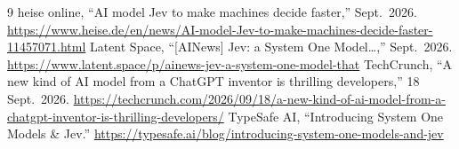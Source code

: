 \documentclass[11pt]{article}
\begin{document}
\begin{thebibliography}{9}
 heise online, ``AI model Jev to make machines decide faster,'' Sept.\ 2026.
  \url{https://www.heise.de/en/news/AI-model-Jev-to-make-machines-decide-faster-11457071.html}
 Latent Space, ``[AINews] Jev: a System One Model\dots,'' Sept.\ 2026.
  \url{https://www.latent.space/p/ainews-jev-a-system-one-model-that}
 TechCrunch, ``A new kind of AI model from a ChatGPT inventor is thrilling developers,'' 18 Sept.\ 2026.
  \url{https://techcrunch.com/2026/09/18/a-new-kind-of-ai-model-from-a-chatgpt-inventor-is-thrilling-developers/}
 TypeSafe AI, ``Introducing System One Models \& Jev.''
  \url{https://typesafe.ai/blog/introducing-system-one-models-and-jev}
\end{thebibliography}
\end{document}
